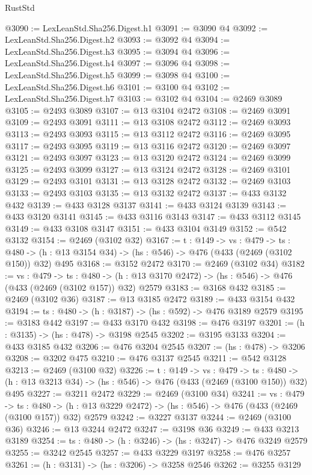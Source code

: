 \begin{lexlean}{RustStd}
\begin{coremodule}
@3090 := LexLeanStd.Sha256.Digest.h1
@3091 := @3090 @4
@3092 := LexLeanStd.Sha256.Digest.h2
@3093 := @3092 @4
@3094 := LexLeanStd.Sha256.Digest.h3
@3095 := @3094 @4
@3096 := LexLeanStd.Sha256.Digest.h4
@3097 := @3096 @4
@3098 := LexLeanStd.Sha256.Digest.h5
@3099 := @3098 @4
@3100 := LexLeanStd.Sha256.Digest.h6
@3101 := @3100 @4
@3102 := LexLeanStd.Sha256.Digest.h7
@3103 := @3102 @4
@3104 := @2469 @3089
@3105 := @2493 @3089
@3107 := @13 @3104 @2472
@3108 := @2469 @3091
@3109 := @2493 @3091
@3111 := @13 @3108 @2472
@3112 := @2469 @3093
@3113 := @2493 @3093
@3115 := @13 @3112 @2472
@3116 := @2469 @3095
@3117 := @2493 @3095
@3119 := @13 @3116 @2472
@3120 := @2469 @3097
@3121 := @2493 @3097
@3123 := @13 @3120 @2472
@3124 := @2469 @3099
@3125 := @2493 @3099
@3127 := @13 @3124 @2472
@3128 := @2469 @3101
@3129 := @2493 @3101
@3131 := @13 @3128 @2472
@3132 := @2469 @3103
@3133 := @2493 @3103
@3135 := @13 @3132 @2472
@3137 := @433 @3132 @432
@3139 := @433 @3128 @3137
@3141 := @433 @3124 @3139
@3143 := @433 @3120 @3141
@3145 := @433 @3116 @3143
@3147 := @433 @3112 @3145
@3149 := @433 @3108 @3147
@3151 := @433 @3104 @3149
@3152 := @542 @3132
@3154 := @2469 (@3102 @32)
@3167 := {t : @149} ->
  {vs : @479} ->
  {ts : @480} -> (h : @13 @3154 @34) -> (hs : @546) -> @476 (@433 (@2469 (@3102 @150)) @32) @495
@3168 := @3152 @2472
@3170 := @2469 (@3102 @34)
@3182 := {vs : @479} ->
  {ts : @480} -> (h : @13 @3170 @2472) -> (hs : @546) -> @476 (@433 (@2469 (@3102 @157)) @32) @2579
@3183 := @3168 @432
@3185 := @2469 (@3102 @36)
@3187 := @13 @3185 @2472
@3189 := @433 @3154 @432
@3194 := {ts : @480} -> (h : @3187) -> (hs : @592) -> @476 @3189 @2579
@3195 := @3183 @442
@3197 := @433 @3170 @432
@3198 := @476 @3197
@3201 := (h : @3135) -> (hs : @478) -> @3198 @2545
@3202 := @3195 @3133
@3204 := @433 @3185 @432
@3206 := @476 @3204 @2545
@3207 := (hs : @478) -> @3206
@3208 := @3202 @475
@3210 := @476 @3137 @2545
@3211 := @542 @3128
@3213 := @2469 (@3100 @32)
@3226 := {t : @149} ->
  {vs : @479} ->
  {ts : @480} -> (h : @13 @3213 @34) -> (hs : @546) -> @476 (@433 (@2469 (@3100 @150)) @32) @495
@3227 := @3211 @2472
@3229 := @2469 (@3100 @34)
@3241 := {vs : @479} ->
  {ts : @480} -> (h : @13 @3229 @2472) -> (hs : @546) -> @476 (@433 (@2469 (@3100 @157)) @32) @2579
@3242 := @3227 @3137
@3244 := @2469 (@3100 @36)
@3246 := @13 @3244 @2472
@3247 := @3198 @36
@3249 := @433 @3213 @3189
@3254 := {ts : @480} -> (h : @3246) -> (hs : @3247) -> @476 @3249 @2579
@3255 := @3242 @2545
@3257 := @433 @3229 @3197
@3258 := @476 @3257
@3261 := (h : @3131) -> (hs : @3206) -> @3258 @2546
@3262 := @3255 @3129

\end{coremodule}
\end{lexlean}
